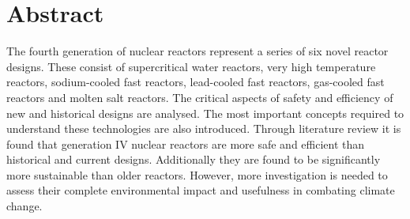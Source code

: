 

\chapter*{Abstract} \label{cha:abstract}


The fourth generation of nuclear reactors represent a series of six novel reactor designs.
These consist of supercritical water reactors, very high temperature reactors, sodium-cooled fast
reactors, lead-cooled fast reactors, gas-cooled fast reactors and molten salt reactors.
The critical aspects of safety and efficiency
of new and historical designs are analysed.
The most important concepts required to understand these technologies are
also introduced. 
Through literature review it is found that generation IV nuclear reactors are more safe
and efficient than historical and current designs. Additionally they are found to be 
significantly more sustainable than older reactors. However, more
investigation is needed to assess their complete environmental impact and usefulness
in combating climate change.

